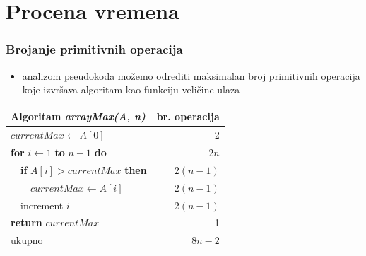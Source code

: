 \documentclass[compress]{beamer}
\begin{document}
\section[Procena]{Procena vremena}
\begin{frame}[fragile]
  \frametitle{Brojanje primitivnih operacija}
  \begin{itemize}
    \item analizom pseudokoda možemo odrediti maksimalan broj primitivnih
    operacija koje izvršava algoritam kao funkciju veličine ulaza
  \end{itemize}
  \begin{center}
    \begin{tabular}{l|r}
      \textbf{Algoritam} \textit{arrayMax(A, n)} & \textbf{br. operacija} \\ \hline
      $currentMax \leftarrow A[0]$ & $2$ \\
      \textbf{for} $i \leftarrow 1$ \textbf{to} $n - 1$ \textbf{do} & $2n$ \\
      \ \ \textbf{if} $A[i] > currentMax$ \textbf{then} & $2(n-1)$ \\
      \ \ \ \ $currentMax \leftarrow A[i]$ & $2(n-1)$ \\
      \ \ increment $i$ & $2(n-1)$ \\
      \textbf{return} $currentMax$ & 1 \\ \hline
      \hfill ukupno & $8n-2$
    \end{tabular}
  \end{center}
\end{frame}
\end{document}

